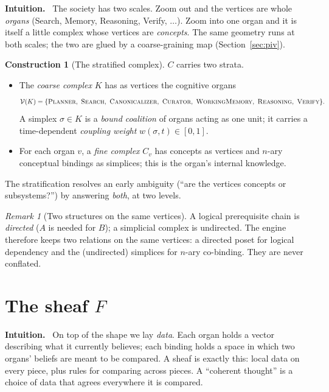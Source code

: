 \documentclass[11pt]{article}
\theoremstyle{definition}
\newtheorem{construction}[definition]{Construction}
\theoremstyle{plain}
\theoremstyle{remark}
\newtheorem{remark}[definition]{Remark}
\newcommand{\Intu}{\noindent\textbf{\color{intuitioncol}Intuition.}\ }
\newcommand{\CC}{C}                 %
\newcommand{\Kc}{K}                 %
\newcommand{\Fs}{F}                 %
\begin{document}
\begin{intu}\Intu
The society has two scales. Zoom out and the vertices are whole \emph{organs}
(Search, Memory, Reasoning, Verify, $\dots$). Zoom into one organ and it is itself a
little complex whose vertices are \emph{concepts}. The same geometry runs at both
scales; the two are glued by a coarse-graining map (Section~\ref{sec:piv}).
\end{intu}

\begin{construction}[The stratified complex]\label{con:strat}
$\CC$ carries two strata.
\begin{itemize}[nosep]
  \item The \emph{coarse complex} $\Kc$ has as vertices the cognitive organs
        \[
        \mathcal{V}(\Kc)=\{\textsc{Planner},\ \textsc{Search},\
        \textsc{Canonicalizer},\ \textsc{Curator},\ \textsc{WorkingMemory},\
        \textsc{Reasoning},\ \textsc{Verify}\}.
        \]
        A simplex $\sigma\in\Kc$ is a \emph{bound coalition} of organs acting as one
        unit; it carries a time-dependent \emph{coupling weight}
        $w(\sigma,t)\in[0,1]$.
  \item For each organ $v$, a \emph{fine complex} $\CC_v$ has concepts as vertices and
        $n$-ary conceptual bindings as simplices; this is the organ's internal
        knowledge.
\end{itemize}
The stratification resolves an early ambiguity (``are the vertices concepts or
subsystems?'') by answering \emph{both}, at two levels.
\end{construction}

\begin{remark}[Two structures on the same vertices]
A logical prerequisite chain is \emph{directed} ($A$ is needed for $B$); a simplicial
complex is undirected. The engine therefore keeps two relations on the same vertices:
a directed poset for logical dependency and the (undirected) simplices for $n$-ary
co-binding. They are never conflated.
\end{remark}

\section{The sheaf \texorpdfstring{$\Fs$}{F}}\label{sec:sheaf}

\begin{intu}\Intu
On top of the shape we lay \emph{data}. Each organ holds a vector describing what it
currently believes; each binding holds a space in which two organs' beliefs are meant
to be compared. A sheaf is exactly this: local data on every piece, plus rules for
comparing across pieces. A ``coherent thought'' is a choice of data that agrees
everywhere it is compared.
\end{intu}
\end{document}
